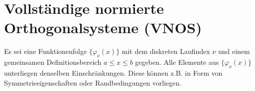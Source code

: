 \chapter{Vollständige normierte Orthogonalsysteme (VNOS)}
Es sei eine Funktionenfolge $\{\varphi_{\nu}(x)\}$ mit dem diskreten Laufindex
$\nu$ und einem gemeinsamen Definitionsbereich $a\le x\le b$ gegeben. Alle
Elemente aus $\{\varphi_{\nu}(x)\}$ unterliegen denselben Einschränkungen.
Diese können z.B. in Form von Symmetrieeigenschaften oder Randbedingungen
vorliegen.
